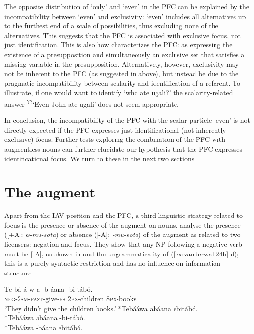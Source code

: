 \documentclass[output=paper]{langsci/langscibook}
\begin{document}
The opposite distribution of ‘only’ and ‘even’ in the PFC can be explained by the incompatibility between ‘even’ and exclusivity: ‘even’ includes all alternatives up to the furthest end of a scale of possibilities, thus excluding none of the alternatives. This suggests that the PFC is associated with exclusive focus, not just identification. This is also how \citet[52]{Walusimbi1996} characterizes the PFC: as expressing the existence of a presupposition and simultaneously an exclusive set that satisfies a missing variable in the presupposition. Alternatively, however, exclusivity may not be inherent to the PFC (as suggested in  above), but instead be due to the pragmatic incompatibility between scalarity and identification of a referent. To illustrate, if one would want to identify ‘who ate ugali?’ the scalarity-related answer \textsuperscript{??}‘Even John ate ugali’ does not seem appropriate.

  In conclusion, the incompatibility of the PFC with the scalar particle ‘even’ is not directly expected if the PFC expresses just identificational (not inherently exclusive) focus. Further tests exploring the combination of the PFC with augmentless nouns can further elucidate our hypothesis that the PFC expresses identificational focus. We turn to these in the next two sections.

\section{The augment}\label{sec:vanderwal:4}

Apart from the IAV position and the PFC, a third linguistic strategy related to focus is the presence or absence of the augment on nouns. \citet{HymanKatamba1990,HymanKatamba1993} analyse the presence ([+A]: \textbf{\textit{o}}\textit{-mu-sota}) or absence ([-A]: \textit{{\longrule}-mu-sota}) of the augment as related to two licensers: negation and focus. They show that any NP following a negative verb must be [-A], as shown in  and the ungrammaticality of (\ref{ex:vanderwal:24b}-d); this is a purely syntactic restriction and has no influence on information structure.

\ea\label{ex:vanderwal:24}
\ea\label{ex:vanderwal:24a}
\gll    Te-bá-á-w-a      {\longrule}-b-áana    {\longrule}-bi-tábó.\\
       \textsc{neg}-\textsc{2sm}-\textsc{past}-give-\textsc{fs}       \textsc{2px}-children       \textsc{8px}-books\\
\glt   ‘They didn't give the children books.’
\ex \label{ex:vanderwal:24b}   *Tebááwa abáana ebitábó.\\
\ex \label{ex:vanderwal:24c}   *Tebááwa abáana {\longrule}-bi-tábó.\\
\ex \label{ex:vanderwal:24d}   *Tebááwa {\longrule}-báana ebitábó. \\
\glt \citep[224]{HymanKatamba1993}
\z
\z
\end{document}
